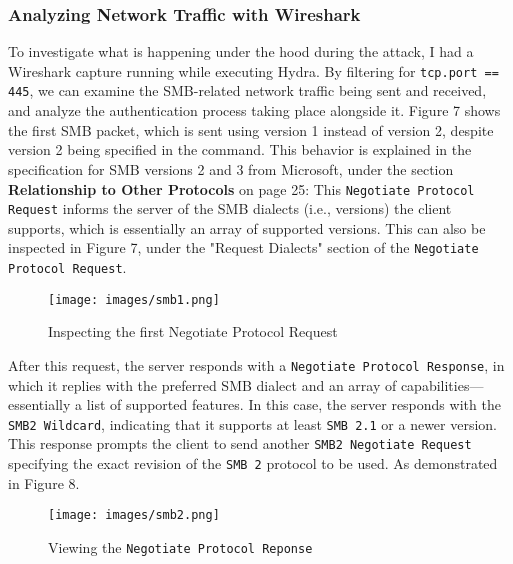 \documentclass[a4paper]{article}
\newcommand{\abc}{\hfill \break}
\begin{document}
\subsubsection{Analyzing Network Traffic with Wireshark}
To investigate what is happening under the hood during the attack, I had a Wireshark capture running while executing Hydra.\abc
By filtering for \texttt{tcp.port == 445}, we can examine the SMB-related network traffic being sent and received, and analyze the authentication process taking place alongside it.\abc
Figure 7 shows the first SMB packet, which is sent using version 1 instead of version 2, despite version 2 being specified in the command. This behavior is explained in the specification for SMB versions 2 and 3 from Microsoft, under the section \textbf{Relationship to Other Protocols} on page 25: \abc
{} \cite{microsoft_corporation_server_2024}\abc
This \texttt{Negotiate Protocol Request} informs the server of the SMB dialects (i.e., versions) the client supports, which is essentially an array of supported versions. This can also be inspected in Figure 7, under the "Request Dialects" section of the \texttt{Negotiate Protocol Request}. \cite{noauthor_controlling_2022}
\begin{figure}[h]
	\texttt{[image: images/smb1.png]}
	\centering
	\caption{Inspecting the first Negotiate Protocol Request}
\end{figure}\abc
After this request, the server responds with a \texttt{Negotiate Protocol Response}, in which it replies with the preferred SMB dialect and an array of capabilities—essentially a list of supported features. In this case, the server responds with the \texttt{SMB2 Wildcard}, indicating that it supports at least \texttt{SMB 2.1} or a newer version. This response prompts the client to send another \texttt{SMB2 Negotiate Request} specifying the exact revision of the \texttt{SMB 2} protocol to be used. As demonstrated in Figure 8. \cite{noauthor_ms-smb2_2024}\newpage
\begin{figure}[h]
	\texttt{[image: images/smb2.png]}
	\centering
	\caption{Viewing the \texttt{Negotiate Protocol Reponse}}
\end{figure}\abc
\end{document}
